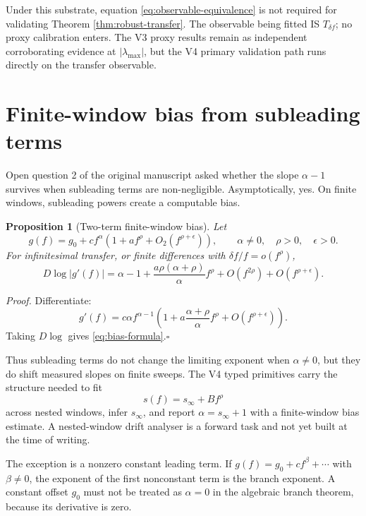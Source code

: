 \documentclass[11pt,a4paper]{article}
\newtheorem{proposition}[theorem]{Proposition}
\begin{document}
Under this substrate, equation \eqref{eq:observable-equivalence} is not required for validating Theorem \ref{thm:robust-transfer}. The observable being fitted IS $T_{\delta f}$; no proxy calibration enters. The V3 proxy results remain as independent corroborating evidence at $|\lambda_{\max}|$, but the V4 primary validation path runs directly on the transfer observable.

\section{Finite-window bias from subleading terms}\label{sec:finite-window-bias}

Open question 2 of the original manuscript asked whether the slope $\alpha-1$ survives when subleading terms are non-negligible. Asymptotically, yes. On finite windows, subleading powers create a computable bias.

\begin{proposition}[Two-term finite-window bias]\label{prop:finite-window-bias}
Let
\[
    g(f)=g_0+c f^\alpha\left(1+a f^\rho+O_2(f^{\rho+\epsilon})\right),
    \qquad \alpha\ne0,
    \quad \rho>0,
    \quad \epsilon>0.
\]
For infinitesimal transfer, or finite differences with $\delta f/f=o(f^\rho)$,
\begin{equation}\label{eq:bias-formula}
    D\log |g'(f)|
    =\alpha-1+\frac{a\rho(\alpha+\rho)}{\alpha}f^\rho
    +O(f^{2\rho})+O(f^{\rho+\epsilon}).
\end{equation}
\end{proposition}

\noindent\emph{Proof.}
Differentiate:
\[
    g'(f)=c\alpha f^{\alpha-1}
    \left(1+a\frac{\alpha+\rho}{\alpha}f^\rho+O(f^{\rho+\epsilon})\right).
\]
Taking $D\log$ gives \eqref{eq:bias-formula}.\hfill$\square$

\noindent
Thus subleading terms do not change the limiting exponent when $\alpha\ne0$, but they do shift measured slopes on finite sweeps. The V4 typed primitives carry the structure needed to fit
\[
    s(f)=s_\infty+Bf^\rho
\]
across nested windows, infer $s_\infty$, and report $\alpha=s_\infty+1$ with a finite-window bias estimate. A nested-window drift analyser is a forward task and not yet built at the time of writing.

The exception is a nonzero constant leading term. If $g(f)=g_0+c f^\beta+\cdots$ with $\beta\ne0$, the exponent of the first nonconstant term is the branch exponent. A constant offset $g_0$ must not be treated as $\alpha=0$ in the algebraic branch theorem, because its derivative is zero.
\end{document}
